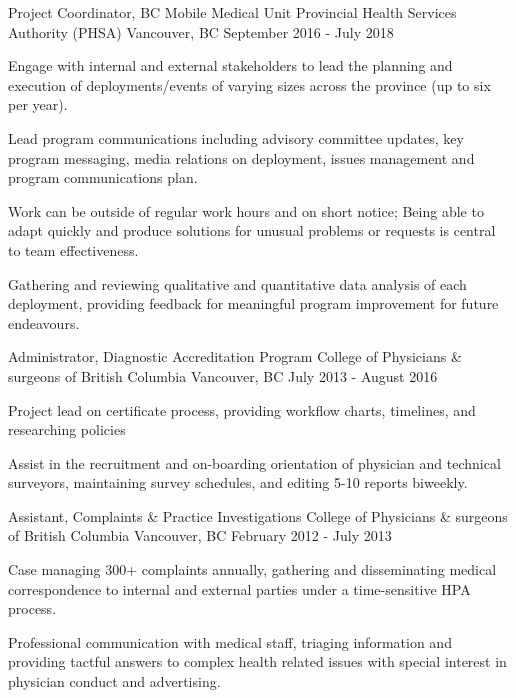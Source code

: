 \begin{cventries}
  \cventry
    {Project Coordinator, BC Mobile Medical Unit} %
    {Provincial Health Services Authority (PHSA)} %
    {Vancouver, BC} %
    {September 2016 - July 2018} %
    {
      \begin{cvitems} %
        \item {Engage with internal and external stakeholders to lead the planning and execution of deployments/events of varying sizes across the province (up to six per year).}
        \item {Lead program communications including advisory committee updates, key program messaging, media relations on deployment, issues management and program communications plan.}
        \item {Work can be outside of regular work hours and on short notice; Being able to adapt quickly and produce solutions for unusual problems or requests is central to team effectiveness.}
       \item {Gathering and reviewing qualitative and quantitative data analysis of each deployment, providing feedback for meaningful program improvement for future endeavours.}
      \end{cvitems}
    }

  \cventry
    {Administrator, Diagnostic Accreditation Program} %
    {College of Physicians \& surgeons of British Columbia } %
    {Vancouver, BC} %
    {July 2013 - August 2016} %
    {
      \begin{cvitems} %
        \item {Project lead on certificate process, providing workflow charts, timelines, and researching policies}
        \item {Assist in the recruitment and on-boarding orientation of physician and technical surveyors, maintaining survey schedules, and editing 5-10 reports biweekly.}
      \end{cvitems}
    }

 \cventry
    {Assistant, Complaints \& Practice Investigations} %
    {College of Physicians \& surgeons of British Columbia } %
    {Vancouver, BC} %
    {February 2012 - July 2013} %
    {
      \begin{cvitems} %
        \item {Case managing 300+ complaints annually, gathering and disseminating medical correspondence to internal and external parties under a time-sensitive HPA process.}
        \item {Professional communication with medical staff, triaging information and providing tactful answers to complex health related issues with special interest in physician conduct and advertising.}
      \end{cvitems}
    }

\end{cventries}
